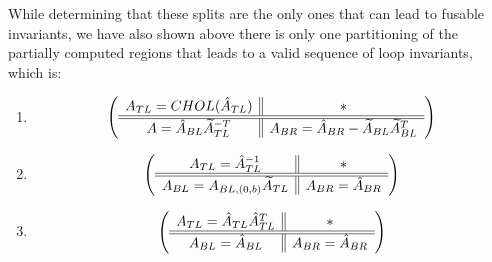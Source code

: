 \documentclass[12pt,letterpaper]{article}
\newcommand*{\opF}{\mathcal{F}}
\begin{document}
While determining that these splits are the only ones that can lead to fusable invariants, we have also shown above there is only one partitioning of the partially computed regions that leads to a valid sequence of loop invariants, which is:
\begin{enumerate}
\item
  \begin{equation*}
  \left( \begin{array}{c || c} A_{TL}  = CHOL(\hat{A}_{TL}) & * \\ \hline \hline A = \hat{A}_{BL}\widetilde{A}_{TL}^{-T} & A_{BR} = \hat{A}_{BR} - \widetilde{A}_{BL}\widetilde{A}_{BL}^T \end{array} \right)
  \end{equation*}
\item
  \begin{equation*}
    \left( \begin{array}{c || c} A_{TL} = \hat{A}_{TL}^{-1} & * \\ \hline \hline A_{BL} = A_{BL, (0, b)}\widetilde{A}_{TL} & A_{BR} =  \hat{A}_{BR} \end{array} \right)
  \end{equation*}
\item
  \begin{equation*}
    \left( \begin{array}{c || c} A_{TL} = \hat{A}_{TL}\hat{A}_{TL}^T & * \\ \hline \hline A_{BL} = \hat{A}_{BL} & A_{BR} = \hat{A}_{BR} \end{array} \right)
  \end{equation*}
\end{enumerate}



\end{document}
